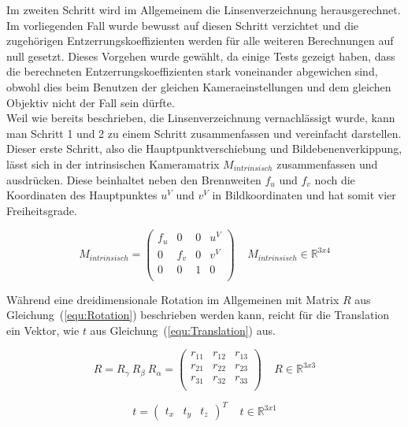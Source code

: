 \begin{description}
Im zweiten Schritt wird im Allgemeinem die Linsenverzeichnung herausgerechnet. Im vorliegenden Fall wurde bewusst auf diesen Schritt verzichtet und die zugehörigen Entzerrungskoeffizienten werden für alle weiteren Berechnungen auf null gesetzt. Dieses Vorgehen wurde gewählt, da einige Tests gezeigt haben, dass die berechneten Entzerrungskoeffizienten stark voneinander abgewichen sind, obwohl dies beim Benutzen der gleichen Kameraeinstellungen und dem gleichen Objektiv nicht der Fall sein dürfte.\\
Weil wie bereits beschrieben, die Linsenverzeichnung vernachlässigt wurde, kann man Schritt 1 und 2 zu einem Schritt zusammenfassen und vereinfacht darstellen. Dieser erste Schritt, also die Hauptpunktverschiebung und Bildebenenverkippung, lässt sich in der intrinsischen Kameramatrix $M_{intrinsisch}$ zusammenfassen und ausdrücken. Diese beinhaltet neben den Brennweiten $f_u$ und $f_v$ noch die Koordinaten des Hauptpunktes $u^V$ und $v^V$ in Bildkoordinaten und hat somit vier Freiheitsgrade.

\begin{equation}
\label{equ:intrinsic}
M_{intrinsisch} = 
\begin{pmatrix}
f_u & 0 & 0 & u^V \\
0 & f_v & 0 & v^V\\
0 & 0 & 1 & 0 \\
\end{pmatrix} 
~ ~ ~ ~ ~M_{intrinsisch} \in \mathbb{R}^{3x4}
\end{equation}

Während eine dreidimensionale Rotation im Allgemeinen mit Matrix $R$ aus Gleichung~(\ref{equ:Rotation}) beschrieben werden kann, reicht für die Translation ein Vektor, wie $t$ aus Gleichung~(\ref{equ:Translation}) aus.

\begin{equation}
\label{equ:Rotation}
R= R_\gamma ~R_\beta ~R_\alpha =
\begin{pmatrix}
r_{11} & r_{12} & r_{13} \\
r_{21} & r_{22} & r_{23} \\
r_{31} & r_{32} & r_{33} \\
\end{pmatrix}
~ ~ ~ ~ ~R \in \mathbb{R}^{3x3}
\end{equation}

\begin{equation}
\label{equ:Translation}
t=
\begin{pmatrix}
t_x & t_y & t_z
\end{pmatrix}^T
~ ~ ~ ~ ~t \in \mathbb{R}^{3x1} 
\end{equation}


\end{description}
